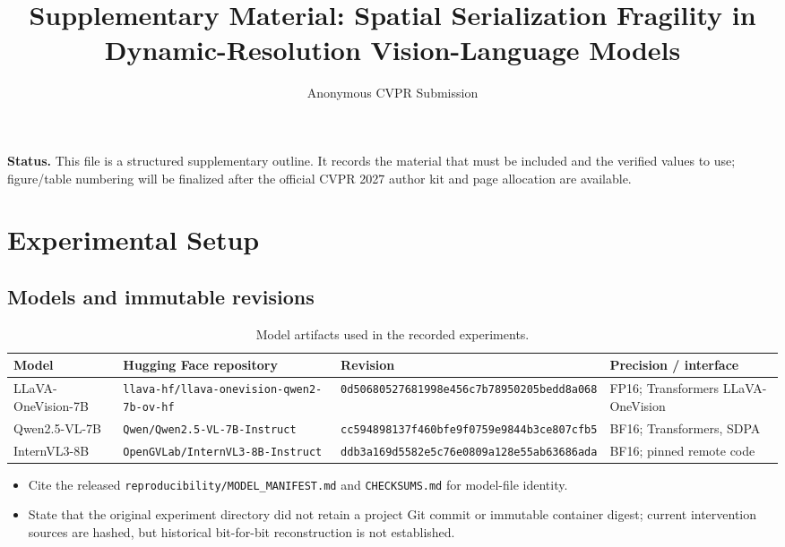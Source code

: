 \documentclass[10pt,twocolumn,letterpaper]{article}
\title{Supplementary Material: Spatial Serialization Fragility in Dynamic-Resolution Vision-Language Models}
\author{Anonymous CVPR Submission}
\date{}
\begin{document}
\maketitle

\noindent\textbf{Status.}
This file is a structured supplementary outline.  It records the material that must be included and the verified values to use; figure/table numbering will be finalized after the official CVPR 2027 author kit and page allocation are available.

\section{Experimental Setup}

\subsection{Models and immutable revisions}

\begin{table}[t]
\centering
\small
\caption{Model artifacts used in the recorded experiments.}
\begin{tabular}{llll}
\toprule
Model & Hugging Face repository & Revision & Precision / interface \\
\midrule
LLaVA-OneVision-7B & \texttt{llava-hf/llava-onevision-qwen2-7b-ov-hf} & \texttt{0d50680527681998e456c7b78950205bedd8a068} & FP16; Transformers LLaVA-OneVision \\
Qwen2.5-VL-7B & \texttt{Qwen/Qwen2.5-VL-7B-Instruct} & \texttt{cc594898137f460bfe9f0759e9844b3ce807cfb5} & BF16; Transformers, SDPA \\
InternVL3-8B & \texttt{OpenGVLab/InternVL3-8B-Instruct} & \texttt{ddb3a169d5582e5c76e0809a128e55ab63686ada} & BF16; pinned remote code \\
\bottomrule
\end{tabular}
\end{table}

\begin{itemize}[leftmargin=*]
    \item Cite the released \texttt{reproducibility/MODEL\_MANIFEST.md} and \texttt{CHECKSUMS.md} for model-file identity.
    \item State that the original experiment directory did not retain a project Git commit or immutable container digest; current intervention sources are hashed, but historical bit-for-bit reconstruction is not established.
\end{itemize}
\end{document}
